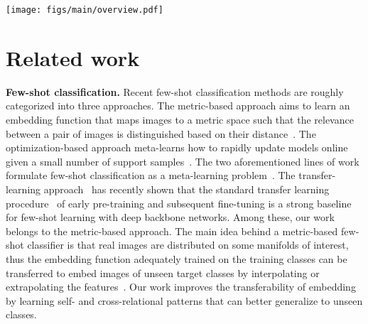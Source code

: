 \documentclass[10pt,twocolumn,letterpaper]{article}
\newcommand{\bs}{\mathbf{s}}
\newcommand{\bC}{\mathbf{C}}
\newcommand{\bq}{\mathbf{q}}
\newcommand{\bF}{\mathbf{F}}
\newcommand{\bA}{\mathbf{A}}
\newcommand{\bZ}{\mathbf{Z}}
\newcommand{\bR}{\mathbf{R}}
\newcommand{\texts}{{\text{s}}}
\newcommand{\textq}{{\text{q}}}
\newcommand{\ours}{RENet\xspace}
\newcommand{\smallbreakparagraph}[1]{\smallbreak \noindent \textbf{#1}}
\begin{document}
\begin{figure*}[t!]
	\centering
	\small
    \texttt{[image: figs/main/overview.pdf]}
	\caption{
	\textbf{Overall architecture of \ours.}
    The base representations, $\bZ_\textq$ and $\bZ_\texts$, are transformed to self-correlation tensors, $\bR_\textq$ and $\bR_\texts$, which are then updated by the convolutional block $g$ to self-correlational representations, $\bF_\textq$ and $\bF_\texts$, respectively.
    The cross-correlation $\bC$ is computed between the pair of image representations and then refined by the convolutional block $h$ to $\hat\bC$, which is bidirectionally aggregated to generate co-attention maps, $\bA_\textq$ and $\bA_\texts$. 
    These co-attention maps are applied to corresponding image representations, $\bF_\textq$ and $\bF_\texts$, and their attended features are aggregated to produce the final relational embeddings, $\bq$ and $\bs$, respectively. 
    }
\label{fig:architecture}
\end{figure*}
 \section{Related work}
\smallbreakparagraph{Few-shot classification.}
Recent few-shot classification methods are roughly categorized into three approaches.
The metric-based approach aims to learn an embedding function that maps images to a metric space such that the relevance between a pair of images is distinguished based on their distance~\cite{koch2015siamese, matchingnet, protonet, tadam, allen2019infinite, li2019revisiting, ctm, tewam, can, feat, deepemd, lifchitz2021local, crosstransformers}.
The optimization-based approach meta-learns how to rapidly update models online given a small number of support samples~\cite{maml, bmaml, leo, ravi2016optimization, mtl}.
The two aforementioned lines of work formulate few-shot classification as a meta-learning problem~\cite{schmidhuber1987evolutionary, bengio1990learning, hochreiter2001learning}.
The transfer-learning approach~\cite{closer, rfs, dhillon2019baseline, wang2020few, negmargin, gidaris2018dynamic, qi2018low, rodriguez2020embedding, ziko2020laplacian} has recently shown that the standard transfer learning procedure~\cite{yosinski2014transferable, oquab2014} of early pre-training and subsequent fine-tuning is a strong baseline for few-shot learning with deep backbone networks.
Among these, our work belongs to the metric-based approach.
The main idea behind a metric-based few-shot classifier is that real images are distributed on some manifolds of interest, thus the embedding function adequately trained on the training classes can be transferred to embed images of unseen target classes by interpolating or extrapolating the features~\cite{tenenbaum1998mapping, facenet}.
Our work improves the transferability of embedding by learning self- and cross-relational patterns that can better generalize to unseen classes.
\end{document}
